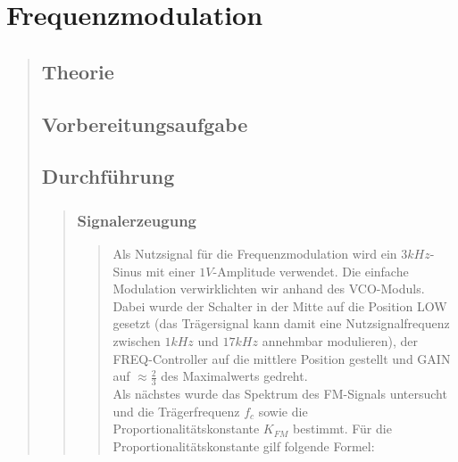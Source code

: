 


\section{Frequenzmodulation}
\begin{quote}
    \subsection{Theorie}
    \begin{quote}
        
    \end{quote}
    
    \subsection{Vorbereitungsaufgabe}
    \begin{quote}
     
    \end{quote}
    
    \subsection{Durchführung}
    \begin{quote}
        \subsubsection{Signalerzeugung}
        \begin{quote}
        Als Nutzsignal für die Frequenzmodulation wird ein $3 kHz$-Sinus mit
        einer $1 V$-Amplitude verwendet. Die einfache Modulation verwirklichten
        wir anhand des VCO-Moduls. Dabei wurde der Schalter in der Mitte auf
        die Position LOW gesetzt (das Trägersignal kann damit eine
        Nutzsignalfrequenz zwischen $1 kHz$ und $17 kHz$ annehmbar modulieren),
        der FREQ-Controller auf die mittlere Position gestellt und GAIN auf
        $\approx \frac{2}{3}$ des Maximalwerts gedreht.\\
        Als nächstes wurde das Spektrum des FM-Signals untersucht und die
        Trägerfrequenz $f_c$ sowie die Proportionalitätskonstante $K_{FM}$
        bestimmt. Für die Proportionalitätskonstante gilf folgende Formel:
        

\end{quote}
\end{quote}
\end{quote}
